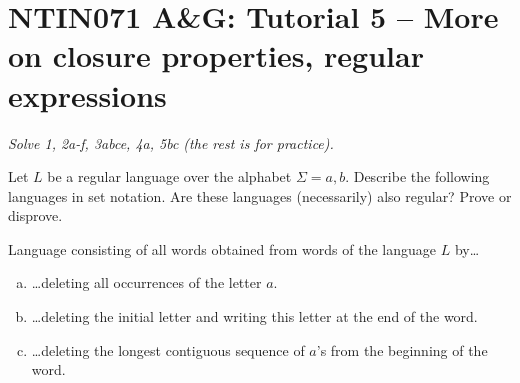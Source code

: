 \documentclass[a4paper,12pt]{amsart}
\begin{document}
\thispagestyle{empty}

\section*{NTIN071 A\&G: Tutorial 5 -- More on closure properties, regular expressions}


\medskip

\noindent\emph{Solve 1, 2a-f, 3abce, 4a, 5bc (the rest is for practice).}

\medskip


\medskip\begin{problem}[Delete]
    
    Let $L$ be a regular language over the alphabet $\Sigma={a,b}$. Describe the following languages in set notation. Are these languages (necessarily) also regular? Prove or disprove.
    
    \medskip

    Language consisting of all words obtained from words of the language $L$ by\dots

    \medskip

    \begin{enumerate}[(a)]\setlength\itemsep{12pt} 
        \item \dots deleting all occurrences of the letter $a$. 
        \item \dots deleting the initial letter and writing this letter at the end of the word. 
        \item \dots deleting the longest contiguous sequence of $a$'s from the beginning of the word.
    \end{enumerate}

\end{problem}
\end{document}

